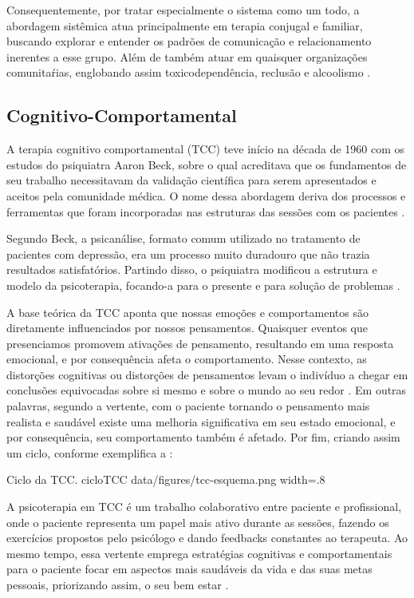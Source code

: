 Consequentemente, por tratar especialmente o sistema como um todo, a abordagem sistêmica atua principalmente em terapia conjugal e familiar, buscando explorar e entender os padrões de comunicação e relacionamento inerentes a esse grupo. Além de também atuar em quaisquer organizações comunitaŕias, englobando assim toxicodependência, reclusão e alcoolismo \cite{Psychotherapy2009}.

\subsection{Cognitivo-Comportamental}
\label{sec:cognitivoComportamental}
A terapia cognitivo comportamental (TCC) teve início na década de 1960 com os estudos do psiquiatra Aaron Beck, sobre o qual acreditava que os fundamentos de seu trabalho necessitavam da validação científica para serem apresentados e aceitos pela comunidade médica. O nome dessa abordagem deriva dos processos e ferramentas que foram incorporadas nas estruturas das sessões com os pacientes \cite{Nogueira2018}.

Segundo Beck, a psicanálise, formato comum utilizado no tratamento de pacientes com depressão, era um processo muito duradouro que não trazia resultados satisfatórios. Partindo disso, o psiquiatra modificou a estrutura e modelo da psicoterapia, focando-a para o presente e para solução de problemas \cite{Barros2022}.

A base teórica da TCC aponta que nossas emoções e comportamentos são diretamente influenciados por nossos pensamentos. Quaisquer eventos que presenciamos promovem ativações de pensamento, resultando em uma resposta emocional, e por consequência afeta o comportamento. Nesse contexto, as distorções cognitivas ou distorções de pensamentos levam o indivíduo a chegar em conclusões equivocadas sobre si mesmo e sobre o mundo ao seu redor \cite{Education2023}. Em outras palavras, segundo a vertente, com o paciente tornando o pensamento mais realista e saudável existe uma melhoria significativa em seu estado emocional, e por consequência, seu comportamento também é afetado. Por fim, criando assim um ciclo, conforme exemplifica a :

\image
    {Ciclo da TCC.}
    {cicloTCC}
    {data/figures/tcc-esquema.png}
    {width=.8\textwidth}
    {}

A psicoterapia em TCC é um trabalho colaborativo entre paciente e profissional, onde o paciente representa um papel mais ativo durante as sessões, fazendo os exercícios propostos pelo psicólogo e dando feedbacks constantes ao terapeuta. Ao mesmo tempo, essa vertente emprega estratégias cognitivas e comportamentais para o paciente focar em aspectos mais saudáveis da vida e das suas metas pessoais, priorizando assim, o seu bem estar \cite{Education2023}.